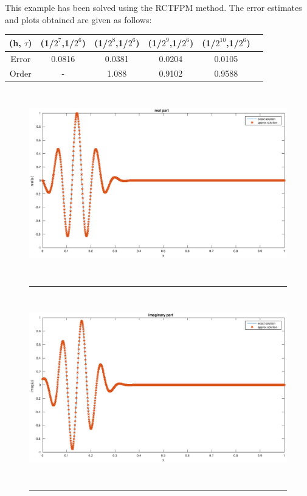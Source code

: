 This example has been solved using the RCTFPM method.
The error estimates and plots obtained are given as follows:

\begin{tabular}{|c|c|c|c|c|c|}
   \hline
   (h, $\tau$)  & (1/$2^{7}$,1/$2^{6}$)  & (1/$2^{8}$,1/$2^{6}$) & (1/$2^{9}$,1/$2^{6}$) &  (1/$2^{10}$,1/$2^{6}$)\\
  \hline
  Error  & 0.0816  & 0.0381 & 0.0204 &  0.0105\\
  \hline
  Order & -  &  1.088  & 0.9102 & 0.9588\\
\hline
\end{tabular}

\begin{figure}[htbp]
	\centering
		\includegraphics[height=8cm]{Figures/real_RCTFPM3_2.eps}\\
		\rule{35em}{0.5pt}
	\caption[RCTFPM Real part]{}
\end{figure}
\begin{figure}[htbp]
	\centering
		\includegraphics[height=8cm]{Figures/imag_RCTFPM3_2.eps}\\
		\rule{35em}{0.5pt}
	\caption[RCTFPM Real part]{}
\end{figure}
\clearpage

